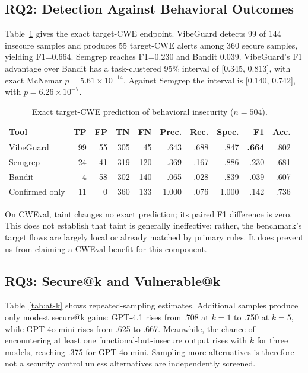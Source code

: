 \documentclass[sigconf,nonacm]{acmart}
\begin{document}
\subsection{RQ2: Detection Against Behavioral Outcomes}

Table~\ref{tab:detection} gives the exact target-CWE endpoint. VibeGuard detects
99 of 144 insecure samples and produces 55 target-CWE alerts among 360 secure
samples, yielding F1=0.664. Semgrep reaches F1=0.230 and Bandit 0.039.
VibeGuard's F1 advantage over Bandit has a task-clustered 95\% interval of
[0.345, 0.813], with exact McNemar $p=5.61\times10^{-14}$. Against Semgrep the
interval is [0.140, 0.742], with $p=6.26\times10^{-7}$.

\begin{table}[t]
\caption{Exact target-CWE prediction of behavioral insecurity ($n=504$).}
\label{tab:detection}
\centering
\small
\begin{tabular}{lrrrrrrrrr}
\toprule
Tool & TP & FP & TN & FN & Prec. & Rec. & Spec. & F1 & Acc. \\
\midrule
VibeGuard & 99 & 55 & 305 & 45 & .643 & .688 & .847 & \textbf{.664} & .802 \\
Semgrep & 24 & 41 & 319 & 120 & .369 & .167 & .886 & .230 & .681 \\
Bandit & 4 & 58 & 302 & 140 & .065 & .028 & .839 & .039 & .607 \\
Confirmed only & 11 & 0 & 360 & 133 & 1.000 & .076 & 1.000 & .142 & .736 \\
\bottomrule
\end{tabular}
\end{table}

On CWEval, taint changes no exact prediction; its paired F1 difference is zero.
This does not establish that
taint is generally ineffective; rather, the benchmark's target flows are
largely local or already matched by primary rules. It does prevent us from
claiming a CWEval benefit for this component.

\subsection{RQ3: Secure@k and Vulnerable@k}

Table~\ref{tab:at-k} shows repeated-sampling estimates. Additional samples
produce only modest secure@k gains: GPT-4.1 rises from .708 at $k=1$ to .750 at
$k=5$, while GPT-4o-mini rises from .625 to .667. Meanwhile, the chance of
encountering at least one functional-but-insecure output rises with $k$ for
three models, reaching .375 for GPT-4o-mini. Sampling more alternatives is
therefore not a security control unless alternatives are independently
screened.
\end{document}
